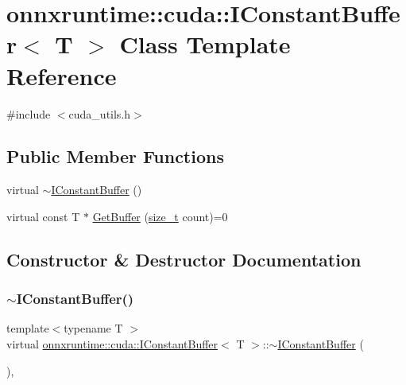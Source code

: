 \hypertarget{classonnxruntime_1_1cuda_1_1IConstantBuffer}{}\section{onnxruntime\+:\+:cuda\+:\+:I\+Constant\+Buffer$<$ T $>$ Class Template Reference}
\label{classonnxruntime_1_1cuda_1_1IConstantBuffer}


{\ttfamily \#include $<$cuda\+\_\+utils.\+h$>$}

\subsection*{Public Member Functions}
\begin{DoxyCompactItemize}
\item 
virtual \mbox{\hyperlink{classonnxruntime_1_1cuda_1_1IConstantBuffer_ae1ac811e370b63efefd7f80d19431acc}{$\sim$\+I\+Constant\+Buffer}} ()
\item 
virtual const T $\ast$ \mbox{\hyperlink{classonnxruntime_1_1cuda_1_1IConstantBuffer_a855f00d4a419a2847a607319c5f20dfc}{Get\+Buffer}} (\mbox{\hyperlink{mlasi_8h_a503efbc1c6e50825320ad909366b78ab}{size\+\_\+t}} count)=0
\end{DoxyCompactItemize}


\subsection{Constructor \& Destructor Documentation}
\mbox{\label{classonnxruntime_1_1cuda_1_1IConstantBuffer_ae1ac811e370b63efefd7f80d19431acc}} 
\subsubsection{\texorpdfstring{$\sim$\+I\+Constant\+Buffer()}{~IConstantBuffer()}}
{\footnotesize\ttfamily template$<$typename T $>$ \\
virtual \mbox{\hyperlink{classonnxruntime_1_1cuda_1_1IConstantBuffer}{onnxruntime\+::cuda\+::\+I\+Constant\+Buffer}}$<$ T $>$\+::$\sim$\mbox{\hyperlink{classonnxruntime_1_1cuda_1_1IConstantBuffer}{I\+Constant\+Buffer}} (\begin{DoxyParamCaption}{ }\end{DoxyParamCaption})\hspace{0.3cm}{\ttfamily [inline]}, {\ttfamily [virtual]}}



